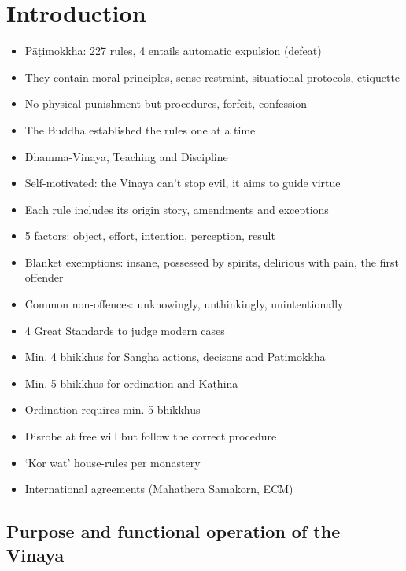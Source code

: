 \chapter{Introduction}

\begin{itemize}
\tightlist
\item
  Pāṭimokkha: 227 rules, 4 entails automatic expulsion (defeat)
\item
  They contain moral principles, sense restraint, situational protocols,
  etiquette
\item
  No physical punishment but procedures, forfeit, confession
\item
  The Buddha established the rules one at a time
\item
  Dhamma-Vinaya, Teaching and Discipline
\item
  Self-motivated: the Vinaya can't stop evil, it aims to guide virtue
\item
  Each rule includes its origin story, amendments and exceptions
\item
  5 factors: object, effort, intention, perception, result
\item
  Blanket exemptions: insane, possessed by spirits, delirious with pain,
  the first offender
\item
  Common non-offences: unknowingly, unthinkingly, unintentionally
\item
  4 Great Standards to judge modern cases
\item
  Min. 4 bhikkhus for Sangha actions, decisons and Patimokkha
\item
  Min. 5 bhikkhus for ordination and Kaṭhina
\item
  Ordination requires min. 5 bhikkhus
\item
  Disrobe at free will but follow the correct procedure
\item
  `Kor wat' house-rules per monastery
\item
  International agreements (Mahathera Samakorn, ECM)
\end{itemize}

\section{Purpose and functional operation of the Vinaya}

